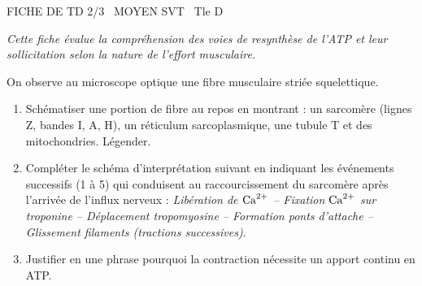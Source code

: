\documentclass[11pt]{article}
\begin{document}
\begin{tcolorbox}[enhanced,colback=popink,colframe=popink,arc=10pt,boxrule=0pt,left=12pt,right=12pt,top=9pt,bottom=9pt]
{\color{white}\popxbold\small FICHE DE TD 2/3 \textbullet\ MOYEN \hfill SVT \textbullet\ Tle D\par}
\end{tcolorbox}
\vspace{4pt}
\noindent \textit{Cette fiche évalue la compréhension des voies de resynthèse de l'ATP et leur sollicitation selon la nature de l'effort musculaire.}

\begin{exercice}
On observe au microscope optique une fibre musculaire striée squelettique.
\begin{enumerate}
    \item Schématiser une portion de fibre au repos en montrant : un sarcomère (lignes Z, bandes I, A, H), un réticulum sarcoplasmique, une tubule T et des mitochondries. Légender.
    \item Compléter le schéma d'interprétation suivant en indiquant les événements successifs (1 à 5) qui conduisent au raccourcissement du sarcomère après l'arrivée de l'influx nerveux : \textit{Libération de $\ce{Ca^{2+}}$ -- Fixation $\ce{Ca^{2+}}$ sur troponine -- Déplacement tropomyosine -- Formation ponts d'attache -- Glissement filaments (tractions successives)}.
    \item Justifier en une phrase pourquoi la contraction nécessite un apport continu en ATP.
\end{enumerate}
\end{exercice}
\end{document}
